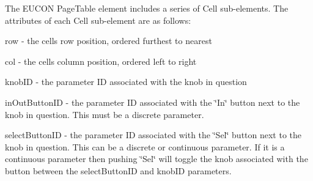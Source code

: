 The E\+U\+C\+O\+N {\ttfamily Page\+Table} element includes a series of {\ttfamily Cell} sub-\/elements. The attributes of each {\ttfamily Cell} sub-\/element are as follows\+: 
\begin{DoxyItemize}
\item {\ttfamily row} -\/ the cell\textquotesingle{}s row position, ordered furthest to nearest  
\item {\ttfamily col} -\/ the cell\textquotesingle{}s column position, ordered left to right  
\item {\ttfamily knob\+I\+D} -\/ the parameter I\+D associated with the knob in question 
\item {\ttfamily in\+Out\+Button\+I\+D} -\/ the parameter I\+D associated with the \char`\"{}\+In\char`\"{} button next to the knob in question. This must be a discrete parameter. 
\item {\ttfamily select\+Button\+I\+D} -\/ the parameter I\+D associated with the \char`\"{}\+Sel\char`\"{} button next to the knob in question. This can be a discrete or continuous parameter. If it is a continuous parameter then pushing \char`\"{}\+Sel\char`\"{} will toggle the knob associated with the button between the {\ttfamily select\+Button\+I\+D} and {\ttfamily knob\+I\+D} parameters. 
\end{DoxyItemize}


